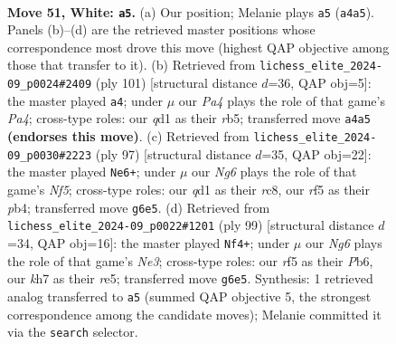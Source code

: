 \documentclass[11pt]{article}
\begin{document}
\clearpage

\begin{figure}[p]\centering
\begin{subfigure}{0.46\textwidth}\centering
\resizebox{\linewidth}{!}{%
\newchessgame
\chessboard[
  setfen={8/2r3pk/1p4N1/5r2/P2pp3/R7/5PK1/3q4 w - - 6 51},
  showmover=false,
  pgfstyle=straightmove, color=movearrow, markmove={a4-a5}
]}
\caption{}
\end{subfigure}\hfill
\begin{subfigure}{0.46\textwidth}\centering
\resizebox{\linewidth}{!}{%
\newchessgame
\chessboard[
  setfen={8/7k/7p/pR5P/6P1/3nPK2/r7/8 b - - 0 51},
  showmover=false,
  pgfstyle=straightmove, color=movearrow, markmove={a5-a4}
]}
\caption{}
\end{subfigure}
\\[4pt]
\begin{subfigure}{0.46\textwidth}\centering
\resizebox{\linewidth}{!}{%
\newchessgame
\chessboard[
  setfen={2R5/4kp2/8/1p2P3/1P2Knr1/b1P5/8/1R6 b - - 3 49},
  showmover=false,
  pgfstyle=straightmove, color=movearrow, markmove={f4-e6}
]}
\caption{}
\end{subfigure}\hfill
\begin{subfigure}{0.46\textwidth}\centering
\resizebox{\linewidth}{!}{%
\newchessgame
\chessboard[
  setfen={8/p4k2/1p2n3/4R2P/6P1/P2r4/1P3PK1/8 b - - 2 50},
  showmover=false,
  pgfstyle=straightmove, color=movearrow, markmove={e6-f4}
]}
\caption{}
\end{subfigure}
\caption{\textbf{Move 51, White: \texttt{a5}.} (a) Our position; Melanie plays \texttt{a5} (\texttt{a4a5}). Panels (b)--(d) are the retrieved master positions whose correspondence most drove this move (highest QAP objective among those that transfer to it). (b) Retrieved from \texttt{lichess\_elite\_2024-09\_p0024\#2409} (ply 101) [structural distance $d$=36, QAP obj=5]: the master played \texttt{a4}; under $\mu$ our \emph{Pa4} plays the role of that game's \emph{Pa4}; cross-type roles: our \emph{q}d1 as their \emph{r}b5; transferred move \texttt{a4a5} \textbf{(endorses this move)}. (c) Retrieved from \texttt{lichess\_elite\_2024-09\_p0030\#2223} (ply 97) [structural distance $d$=35, QAP obj=22]: the master played \texttt{Ne6+}; under $\mu$ our \emph{Ng6} plays the role of that game's \emph{Nf5}; cross-type roles: our \emph{q}d1 as their \emph{r}c8, our \emph{r}f5 as their \emph{p}b4; transferred move \texttt{g6e5}. (d) Retrieved from \texttt{lichess\_elite\_2024-09\_p0022\#1201} (ply 99) [structural distance $d$=34, QAP obj=16]: the master played \texttt{Nf4+}; under $\mu$ our \emph{Ng6} plays the role of that game's \emph{Ne3}; cross-type roles: our \emph{r}f5 as their \emph{P}b6, our \emph{k}h7 as their \emph{r}e5; transferred move \texttt{g6e5}. Synthesis: 1 retrieved analog transferred to \texttt{a5} (summed QAP objective 5, the strongest correspondence among the candidate moves); Melanie committed it via the \texttt{search} selector.}
\label{fig:thought-m100}
\end{figure}
\end{document}
